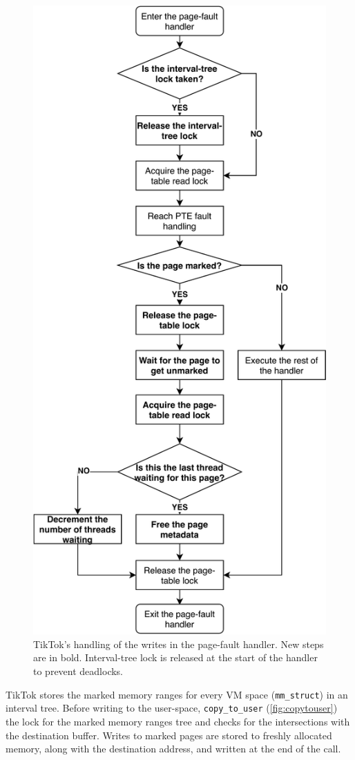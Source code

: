 \documentclass[conference]{IEEEtran}
\newcommand{\sysname}{TikTok}
\begin{document}
\begin{figure}[]
  \centering
  \includegraphics[width = 0.8\linewidth]{img/pagefault.pdf}
  \caption{\sysname's handling of the writes in the page-fault handler. New steps are in bold. Interval-tree lock
  is released at the start of the handler to prevent deadlocks.
}
  \label{fig:pagefault}
\end{figure}

\sysname{} stores the marked memory ranges for every VM space
(\texttt{mm\_struct}) in an interval tree. Before writing to the user-space,
\texttt{copy\_to\_user} (\autoref{fig:copytouser}) the lock for the marked
memory ranges tree and checks for the intersections with the destination buffer.
Writes to marked pages are stored to freshly allocated memory, along with the
destination address, and written at the end of the call.
\end{document}
